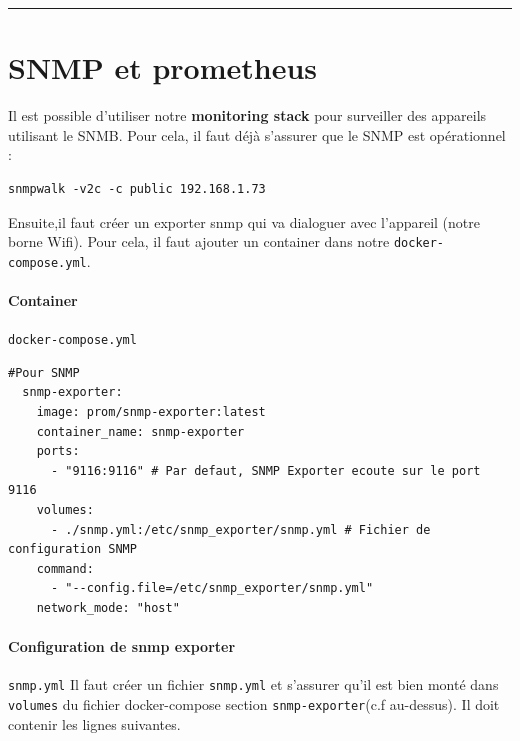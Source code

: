 \documentclass[french, 12pt]{article}%
\newif\ifPROF
\begin{document}
\begin{center}
 \rule{0.75\linewidth}{1pt}
 \end{center}

\ifPROF
\color{red}
NMPv1 et SNMPv2c
Transmission en clair : Les données (y compris les mots de passe, appelés "communautés") sont transmises en clair sur le réseau.
Chiffrement disponible : SNMPv3 introduit des mécanismes de sécurité avancés, notammen

\normalcolor
\fi

\section{SNMP et prometheus}

Il est possible d'utiliser notre \textbf{monitoring stack} pour surveiller des appareils utilisant le SNMB. Pour cela, il faut déjà s'assurer que le SNMP est opérationnel : 

\begin{lstlisting}[style=commande] 
snmpwalk -v2c -c public 192.168.1.73
\end{lstlisting} 

Ensuite,il faut créer un exporter snmp qui va dialoguer avec l'appareil (notre borne Wifi). Pour cela, il faut ajouter un container dans notre \verb?docker-compose.yml?.

\paragraph{Container } \verb?docker-compose.yml?

\begin{lstlisting}[style=commande] 
#Pour SNMP	
  snmp-exporter:
    image: prom/snmp-exporter:latest
    container_name: snmp-exporter
    ports:
      - "9116:9116" # Par defaut, SNMP Exporter ecoute sur le port 9116
    volumes:
      - ./snmp.yml:/etc/snmp_exporter/snmp.yml # Fichier de configuration SNMP
    command:
      - "--config.file=/etc/snmp_exporter/snmp.yml"
    network_mode: "host"
\end{lstlisting} 


\paragraph{Configuration de snmp exporter } \verb?snmp.yml?
Il faut créer un fichier \verb?snmp.yml? et s'assurer qu'il est bien monté dans \verb?volumes? du fichier docker-compose section \verb?snmp-exporter?(c.f au-dessus).  Il doit contenir les lignes suivantes.
\end{document}
